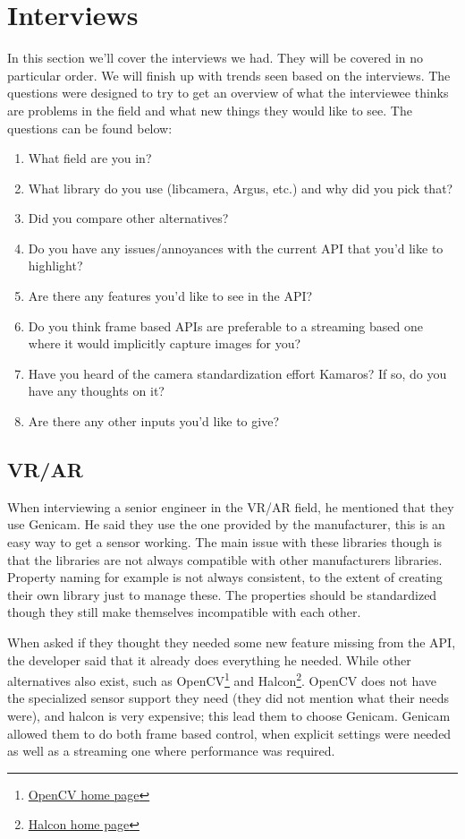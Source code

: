 \chapter{Interviews}
In this section we'll cover the interviews we had. They will be covered in no
particular order. We will finish up with trends seen based on the interviews.
The questions were designed to try to get an overview of what the interviewee
thinks are problems in the field and what new things they would like to see.
The questions can be found below:

\begin{enumerate}
    \item What field are you in?
    \item What library do you use (libcamera, Argus, etc.) and why did you pick that?
    \item Did you compare other alternatives?
    \item Do you have any issues/annoyances with the current API that you'd like to highlight?
    \item Are there any features you'd like to see in the API?
    \item Do you think frame based APIs are preferable to a streaming based one where it would implicitly capture images for you?
    \item Have you heard of the camera standardization effort Kamaros? If so, do you have any thoughts on it?
    \item Are there any other inputs you'd like to give?
\end{enumerate}

\section{VR/AR}\label{section:interview:vrar}
When interviewing a senior engineer in the VR/AR field, he mentioned that
they use Genicam. He said they use the one provided by the manufacturer, this
is an easy way to get a sensor working. The main issue with these libraries
though is that the libraries are not always compatible with other manufacturers
libraries. Property naming for example is not always consistent, to the extent
of creating their own library just to manage these. The properties should be
standardized though they still make themselves incompatible with each other.

When asked if they thought they needed some new feature missing from the API,
the developer said that it already does everything he needed. While other
alternatives also exist, such as OpenCV\footnote{\href{https://opencv.org/}{OpenCV home page}}
and Halcon\footnote{\href{https://www.mvtec.com/products/halcon}{Halcon home page}}.
OpenCV does not have the specialized sensor support they need (they did not
mention what their needs were), and halcon is very expensive; this lead them to
choose Genicam. Genicam allowed them to do both frame based control, when
explicit settings were needed as well as a streaming one where performance was
required.

